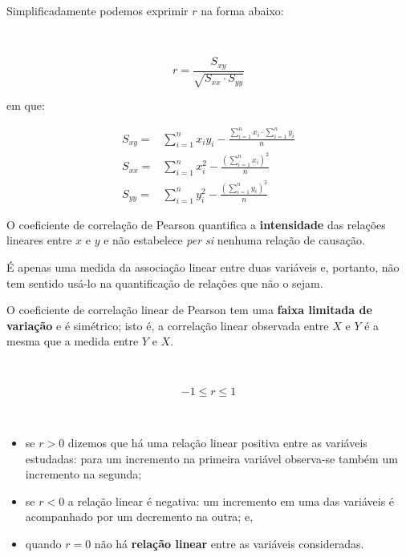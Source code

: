 \documentclass[
]{book}
\providecommand{\tightlist}{%
  \setlength{\itemsep}{0pt}\setlength{\parskip}{0pt}}
\begin{document}
\hfill\break

Simplificadamente podemos exprimir \(r\) na forma abaixo:

~

\[
r=\frac{{S}_{xy}}{\sqrt{{S}_{xx}\cdot {S}_{yy}}}
\]

\hfill\break

em que:

\hfill\break

\begin{align*}
S_{xy} = & \sum_{i=1}^{n} x_{i}y_{i} - \frac{\sum_{i=1}^{n}x_{i}\cdot\sum_{i=1}^{n}y_{i}}{n} \\
S_{xx} = & \sum_{i=1}^{n} x_{i}^{2} - \frac{(\sum_{i=1}^{n} x_{i})^{2}}{n} \\
S_{yy} = & \sum_{i=1}^{n}y_{i}^{2} - \frac{(\sum_{i=1}^{n} y_{i})^{2}}{n} 
\end{align*}

\hfill\break

O coeficiente de correlação de Pearson quantifica a \textbf{intensidade} das relações lineares entre \(x\) e \(y\) e não estabelece \emph{per si} nenhuma relação de causação.

\hfill\break

É apenas uma medida da associação linear entre duas variáveis e, portanto, não tem sentido usá-lo na quantificação de relações que não o sejam.

\hfill\break

O coeficiente de correlação linear de Pearson tem uma \textbf{faixa limitada de variação} e é simétrico; isto é, a correlação linear observada entre \(X\) e \(Y\) é a mesma que a medida entre \(Y\) e \(X\).

~

\[
-1\le r \le 1
\]

~

\begin{itemize}
\tightlist
\item
  se \(r>0\) dizemos que há uma relação linear positiva entre as variáveis estudadas: para um incremento na primeira variável observa-se também um incremento na segunda;\\
\item
  se \(r<0\) a relação linear é negativa: um incremento em uma das variáveis é acompanhado por um decremento na outra; e,
\item
  quando \(r=0\) não há \textbf{relação linear} entre as variáveis consideradas.
\end{itemize}
\end{document}
